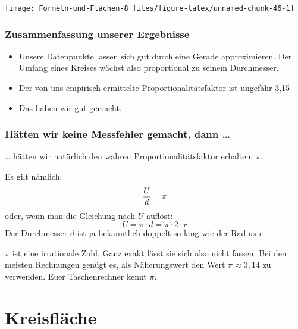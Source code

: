 \documentclass[
  ngerman,
]{book}
\providecommand{\tightlist}{%
  \setlength{\itemsep}{0pt}\setlength{\parskip}{0pt}}
\begin{document}
\begin{center}\texttt{[image: Formeln-und-Flächen-8\_files/figure-latex/unnamed-chunk-46-1]} \end{center}

\hypertarget{zusammenfassung-unserer-ergebnisse}{%
\subsubsection*{Zusammenfassung unserer Ergebnisse}\label{zusammenfassung-unserer-ergebnisse}}

\begin{itemize}
\tightlist
\item
  Unsere Datenpunkte lassen sich gut durch eine Gerade approximieren. Der Umfang eines Kreises wächst also proportional zu seinem Durchmesser.
\item
  Der von uns empirisch ermittelte Proportionalitätsfaktor ist ungefähr 3,15
\item
  Das haben wir gut gemacht.
\end{itemize}

\hypertarget{huxe4tten-wir-keine-messfehler-gemacht-dann}{%
\subsubsection*{Hätten wir keine Messfehler gemacht, dann \ldots{}}\label{huxe4tten-wir-keine-messfehler-gemacht-dann}}

\ldots{} hätten wir natürlich den wahren Proportionalitätsfaktor erhalten: \(\pi\).

Es gilt nämlich: \[{U \over d} = \pi\]
oder, wenn man die Gleichung nach \(U\) auflöst:
\[U= \pi \cdot d = \pi \cdot 2 \cdot r\]
Der Durchmesser \(d\) ist ja bekanntlich doppelt so lang wie der Radius \(r\).

\(\pi\) ist eine irrationale Zahl. Ganz exakt lässt sie sich also nicht fassen. Bei den meisten Rechnungen genügt es, als Näherungswert den Wert \(\pi \approx 3,14\) zu verwenden. Euer Taschenrechner kennt \(\pi\).

\hypertarget{kreisfluxe4che}{%
\section*{Kreisfläche}\label{kreisfluxe4che}}
\end{document}
